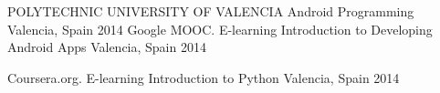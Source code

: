 \begin{cventries}
  \cventry
    {POLYTECHNIC UNIVERSITY OF VALENCIA}
    {Android Programming}
    {Valencia, Spain}
    {2014}
    {
    }
  \cventry
    {Google MOOC. E-learning}
    {Introduction to Developing Android Apps}
    {Valencia, Spain}
    {2014}
    {
    }

  \cventry
    {Coursera.org. E-learning}
    {Introduction to Python}
    {Valencia, Spain}
    {2014}
    {
    }
\end{cventries}
